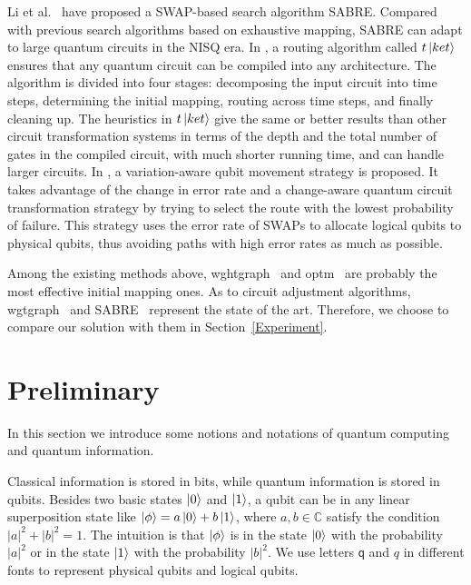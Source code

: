 \documentclass[runningheads]{llncs}
\begin{document}
\begin{itemize}
Li et al.~\cite{Li2018} have proposed a SWAP-based search algorithm SABRE. Compared with previous search algorithms based on exhaustive mapping, SABRE
can adapt to large quantum circuits in the NISQ era. In \cite{Cowtan2019}, a routing algorithm called $t\left\vert{ket}\right\rangle$  ensures that any quantum circuit can be compiled into any architecture. The algorithm is divided into four stages: decomposing the input circuit into time steps, determining the initial mapping, routing across time steps, and finally cleaning up. The heuristics in $t\left\vert{ket}\right\rangle$ give the same or better results than other circuit transformation systems in terms of the depth and the total number of gates in the compiled circuit, with much shorter running time, and can handle larger circuits. In \cite{Tannu2019},  a variation-aware qubit movement strategy is proposed. It takes advantage of the change in error rate and a change-aware quantum circuit transformation strategy by trying to select the route with the lowest probability of failure. This strategy uses the error rate of  SWAPs to allocate logical qubits to physical qubits, thus avoiding paths with high error rates as much as possible.
\end{itemize}

Among the existing methods above, wghtgraph~\cite{2020Qubit} and optm~\cite{Zulehner2017} are probably the most effective initial mapping ones. As to circuit adjustment algorithms, wgtgraph~\cite{2020Qubit} and SABRE~\cite{Li2018} represent the state of the art. Therefore, we choose to compare our solution with them in Section~\ref{Experiment}.


\section{Preliminary}
\label{Background}
In this section we introduce some notions and notations of quantum computing and quantum information.

Classical information is stored in bits, while quantum information is stored in qubits. 
Besides two basic states $\left\vert{0}\right\rangle$ and $\left\vert{1}\right\rangle$,
a qubit can be in any linear superposition state like $\left\vert{\phi}\right\rangle=a\left\vert{0}\right\rangle+b\left\vert{1}\right\rangle$,
where $a,b\in \mathbb{C}$ satisfy the condition $|a|^{2}+|b|^{2}=1$.
The intuition is that $\left\vert{\phi}\right\rangle$ is in the state $\left\vert{0}\right\rangle$ with the probability $|a|^{2}$ or in the state $\left\vert{1}\right\rangle$ with the probability $|b|^{2}$.
We use letters $\textsf{q}$ and $\textit{q}$ in different fonts to represent physical qubits and logical qubits.
\end{document}
